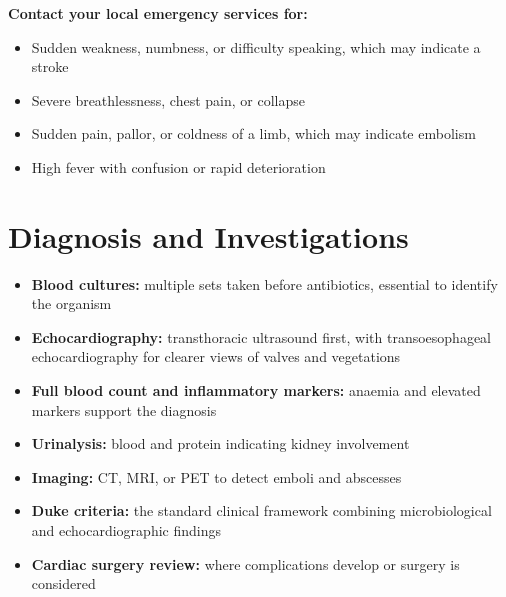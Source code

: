 \textbf{Contact your local emergency services for:}
\begin{itemize}
    \item Sudden weakness, numbness, or difficulty speaking, which may indicate a stroke
    \item Severe breathlessness, chest pain, or collapse
    \item Sudden pain, pallor, or coldness of a limb, which may indicate embolism
    \item High fever with confusion or rapid deterioration
\end{itemize}

\section*{Diagnosis and Investigations}
\begin{itemize}
    \item \textbf{Blood cultures:} multiple sets taken before antibiotics, essential to identify the organism
    \item \textbf{Echocardiography:} transthoracic ultrasound first, with transoesophageal echocardiography for clearer views of valves and vegetations
    \item \textbf{Full blood count and inflammatory markers:} anaemia and elevated markers support the diagnosis
    \item \textbf{Urinalysis:} blood and protein indicating kidney involvement
    \item \textbf{Imaging:} CT, MRI, or PET to detect emboli and abscesses
    \item \textbf{Duke criteria:} the standard clinical framework combining microbiological and echocardiographic findings
    \item \textbf{Cardiac surgery review:} where complications develop or surgery is considered
\end{itemize}

